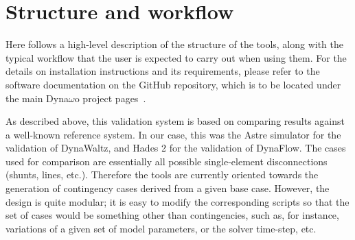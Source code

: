 \documentclass[conference]{IEEEtran}
\begin{document}
\section{Structure and workflow}

Here follows a high-level description of the structure of the tools,
along with the typical workflow that the user is expected to carry out
when using them.  For the details on installation instructions and its
requirements, please refer to the software documentation on the GitHub
repository, which is to be located under the main Dyna$\omega$o
project pages~\cite{DwoGitRepos}.

As described above, this validation system is based on comparing
results against a well-known reference system. In our case, this was
the Astre simulator for the validation of DynaWaltz, and Hades 2 for
the validation of DynaFlow. The cases used for comparison are
essentially all possible single-element disconnections (shunts, lines,
etc.). Therefore the tools are currently oriented towards the
generation of contingency cases derived from a given base
case. However, the design is quite modular; it is easy to modify the
corresponding scripts so that the set of cases would be something
other than contingencies, such as, for instance, variations of a given
set of model parameters, or the solver time-step, etc.
\end{document}
